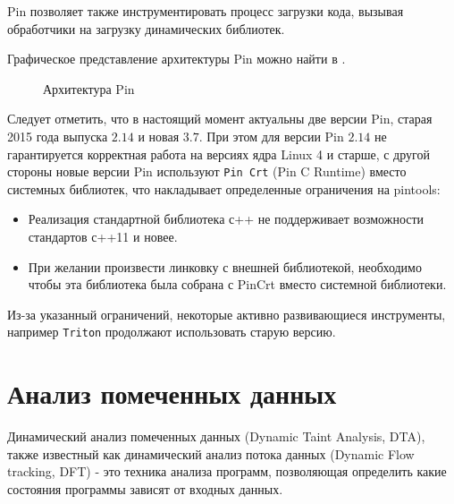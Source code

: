 Pin позволяет также инструментировать процесс загрузки кода, вызывая обработчики на загрузку динамических библиотек.

Графическое представление архитектуры Pin можно найти в \cite{PIN}.
\begin{figure}[H]
    \caption{Архитектура Pin}
    \label{fig:pin}
\end{figure}


Следует отметить, что в настоящий момент актуальны две версии Pin, старая 2015 года выпуска $2.14$ и новая $3.7$. При этом для версии Pin $2.14$ не гарантируется корректная работа на версиях ядра Linux 4 и старше, с другой стороны новые версии Pin используют \texttt{Pin Crt} (Pin C Runtime) вместо системных библиотек, что накладывает определенные ограничения на pintools:

\begin{itemize}
    \item Реализация стандартной библиотека с++ не поддерживает возможности стандартов с++11 и новее.
    \item При желании произвести линковку с внешней библиотекой, необходимо чтобы эта библиотека была собрана с PinCrt вместо системной библиотеки.
\end{itemize}

Из-за указанный ограничений, некоторые активно развивающиеся инструменты, например \texttt{Triton} продолжают использовать старую версию.

\section{Анализ помеченных данных}

Динамический анализ помеченных данных (Dynamic Taint Analysis, DTA), также известный как динамический анализ потока данных (Dynamic Flow tracking, DFT) - это техника анализа программ, позволяющая определить какие состояния программы зависят от входных данных.


